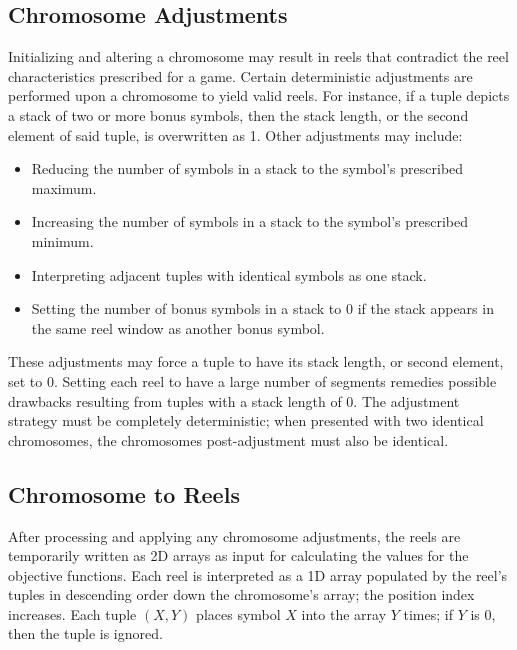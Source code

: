 \documentclass[conference]{IEEEtran}
\begin{document}
\subsection{Chromosome Adjustments}
\label{adjust}
Initializing and altering a chromosome may result in reels that contradict the reel characteristics prescribed for a game.
Certain deterministic adjustments are performed upon a chromosome to yield valid reels.
For instance, if a tuple depicts a stack of two or more bonus symbols, then the stack length, or the second element of said tuple, is overwritten as 1.
Other adjustments may include:
\begin{itemize}
\item Reducing the number of symbols in a stack to the symbol's prescribed maximum.
\item Increasing the number of symbols in a stack to the symbol's prescribed minimum.
\item Interpreting adjacent tuples with identical symbols as one stack.
\item Setting the number of bonus symbols in a stack to 0 if the stack appears in the same reel window as another bonus symbol.
\end{itemize}
These adjustments may force a tuple to have its stack length, or second element, set to 0.
Setting each reel to have a large number of segments remedies possible drawbacks resulting from tuples with a stack length of 0.
The adjustment strategy must be completely deterministic; when presented with two identical chromosomes, the chromosomes post-adjustment must also be identical.
\subsection{Chromosome to Reels}
After processing and applying any chromosome adjustments, the reels are temporarily written as 2D arrays as input for calculating the values for the objective functions.
Each reel is interpreted as a 1D array populated by the reel's tuples in descending order down the chromosome's array; the position index increases.
Each tuple $(X,Y)$ places symbol $X$ into the array $Y$ times; if $Y$ is 0, then the tuple is ignored.
\end{document}
